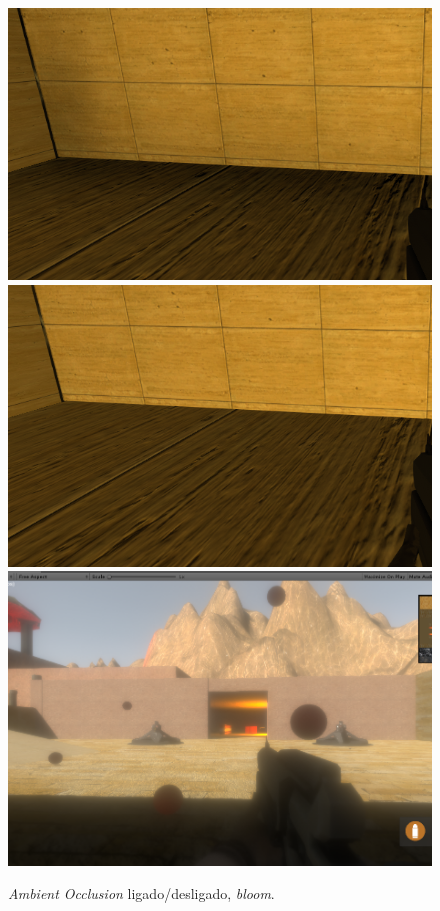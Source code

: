 \documentclass{article}
\begin{document}
        \begin{figure}[h]\begin{center}
            \includegraphics[scale=0.34]{Screenshot_21.png}
            \includegraphics[scale=0.33]{Screenshot_22.png}
            \includegraphics[scale=0.2]{Screenshot_18.png}
            \caption{\textit{Ambient Occlusion} ligado/desligado, \textit{bloom}.}
        \end{center}\end{figure}
\end{document}
